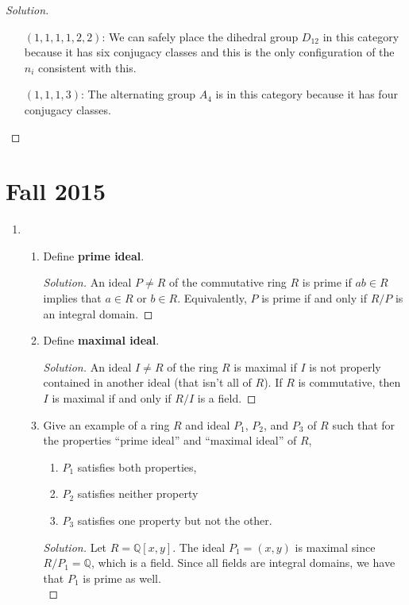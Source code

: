 \documentclass[11pt,letterpaper]{report}
\newcommand{\rationals}{\mathbb{Q}}
\newenvironment{solution}
{\begin{proof}[Solution]}
{\end{proof}}
\begin{document}
\begin{enumerate}
\begin{solution}
\begin{itemize}
			\item[$(1, 1, 1, 1, 2, 2)$:] We can safely place the dihedral group $D_{12}$ in this category because it has six conjugacy classes and this is the only configuration of the $n_i$ consistent with this.

			\item[$(1, 1, 1, 3)$:] The alternating group $A_4$ is in this category because it has four conjugacy classes.
		\end{itemize}
	\end{solution}
\end{enumerate}

\section{Fall 2015}
\begin{enumerate}
	\item \begin{enumerate}
		\item Define \textbf{prime ideal}.
		\begin{solution}
			An ideal $P\neq R$ of the commutative ring $R$ is prime if $ab\in R$ implies that $a\in R$ or $b\in R$. Equivalently, $P$ is prime if and only if $R/P$ is an integral domain.
		\end{solution}
		\item Define \textbf{maximal ideal}.
		\begin{solution}
			An ideal $I\neq R$ of the ring $R$ is maximal if $I$ is not properly contained in another ideal (that isn't all of $R$). If $R$ is commutative, then $I$ is maximal if and only if $R/I$ is a field.
		\end{solution}
		\item Give an example of a ring $R$ and ideal $P_1$, $P_2$, and $P_3$ of $R$ such that for the properties ``prime ideal'' and ``maximal ideal'' of $R$,
		\begin{enumerate}
			\item $P_1$ satisfies both properties,
			\item $P_2$ satisfies neither property
			\item $P_3$ satisfies one property but not the other.
		\end{enumerate}
		\begin{solution}
			Let $R = \rationals[x,y]$. The ideal $P_1 = (x,y)$ is maximal since $R/P_1 = \rationals$, which is a field. Since all fields are integral domains, we have that $P_1$ is prime as well.\\


\end{solution}
\end{enumerate}
\end{enumerate}
\end{document}
